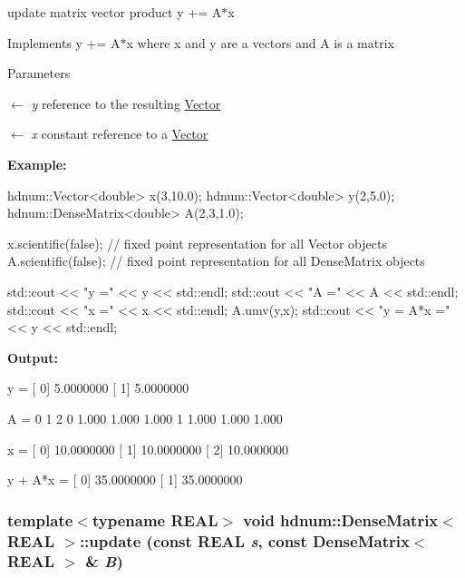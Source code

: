 update matrix vector product y += A$\ast$x 

Implements y += A$\ast$x where x and y are a vectors and A is a matrix


\begin{DoxyParams}{Parameters}
\item[\mbox{$\leftarrow$} {\em y}]reference to the resulting \hyperlink{classhdnum_1_1Vector}{Vector} \item[\mbox{$\leftarrow$} {\em x}]constant reference to a \hyperlink{classhdnum_1_1Vector}{Vector}\end{DoxyParams}
{\bfseries Example:} 
\begin{DoxyCode}
  hdnum::Vector<double> x(3,10.0);
  hdnum::Vector<double> y(2,5.0);
  hdnum::DenseMatrix<double> A(2,3,1.0);

  x.scientific(false); // fixed point representation for all Vector objects
  A.scientific(false); // fixed point representation for all DenseMatrix objects

  std::cout << "y =" << y << std::endl;
  std::cout << "A =" << A << std::endl;
  std::cout << "x =" << x << std::endl;
  A.umv(y,x);
  std::cout << "y = A*x =" << y << std::endl;
\end{DoxyCode}


{\bfseries Output:} \begin{DoxyVerb}
y =
[ 0]      5.0000000
[ 1]      5.0000000

A =
                      0          1          2 
          0       1.000      1.000      1.000 
          1       1.000      1.000      1.000 

x =
[ 0]     10.0000000
[ 1]     10.0000000
[ 2]     10.0000000

y + A*x =
[ 0]     35.0000000
[ 1]     35.0000000
	  \end{DoxyVerb}
 \hypertarget{classhdnum_1_1DenseMatrix_a60a10bbc94192242d3206df18eb0978b}{
\subsubsection[{update}]{\setlength{\rightskip}{0pt plus 5cm}template$<$typename REAL$>$ void {\bf hdnum::DenseMatrix}$<$ REAL $>$::update (const REAL {\em s}, \/  const {\bf DenseMatrix}$<$ REAL $>$ \& {\em B})}}
\label{classhdnum_1_1DenseMatrix_a60a10bbc94192242d3206df18eb0978b}



